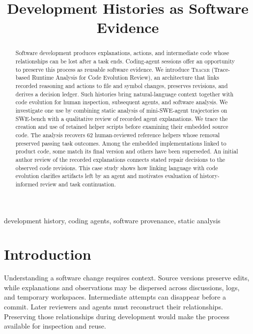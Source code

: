 \documentclass[10pt,conference]{IEEEtran}
\title{Development Histories as Software Evidence}
\author{}
\newcommand{\tracer}{\textsc{Tracer}}
\begin{document}
\maketitle

\begin{abstract}
Software development produces explanations, actions, and intermediate code whose relationships can be lost after a task ends. Coding-agent sessions offer an opportunity to preserve this process as reusable software evidence. We introduce \tracer{} (Trace-based Runtime Analysis for Code Evolution Review), an architecture that links recorded reasoning and actions to file and symbol changes, preserves revisions, and derives a decision ledger. Such histories bring natural-language context together with code evolution for human inspection, subsequent agents, and software analysis. We investigate one use by combining static analysis of mini-SWE-agent trajectories on SWE-bench with a qualitative review of recorded agent explanations. We trace the creation and use of retained helper scripts before examining their embedded source code. The analysis recovers 62 human-reviewed reference helpers whose removal preserved passing task outcomes. Among the embedded implementations linked to product code, some match its final version and others have been superseded. An initial author review of the recorded explanations connects stated repair decisions to the observed code revisions. This case study shows how linking language with code evolution clarifies artifacts left by an agent and motivates evaluation of history-informed review and task continuation.
\end{abstract}
\begin{IEEEkeywords}
development history, coding agents, software provenance, static analysis
\end{IEEEkeywords}

\section{Introduction}
Understanding a software change requires context. Source versions preserve edits, while explanations and observations may be dispersed across discussions, logs, and temporary workspaces. Intermediate attempts can disappear before a commit. Later reviewers and agents must reconstruct their relationships. Preserving those relationships during development would make the process available for inspection and reuse.
\end{document}
